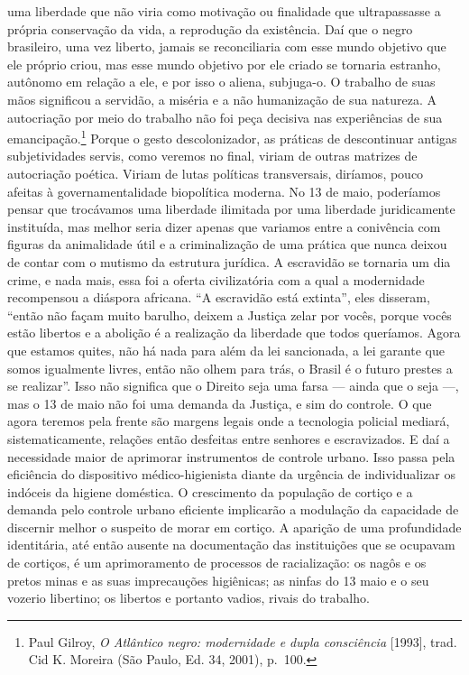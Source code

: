 uma liberdade que não viria como motivação ou finalidade que
ultrapassasse a própria conservação da vida, a reprodução da existência.
Daí que o negro brasileiro, uma vez liberto, jamais se reconciliaria com
esse mundo objetivo que ele próprio criou, mas esse mundo objetivo por
ele criado se tornaria estranho, autônomo em relação a ele, e por isso o
aliena, subjuga-o. O trabalho de suas mãos significou a servidão, a
miséria e a não humanização de sua natureza. A autocriação por meio do
trabalho não foi peça decisiva nas experiências de sua
emancipação.\footnote{Paul Gilroy, \textit{O Atlântico negro: modernidade
  e dupla consciência} {[}1993{]}, trad. Cid K. Moreira (São Paulo, Ed.
  34, 2001), p.~100.} Porque o gesto descolonizador, as práticas de
descontinuar antigas subjetividades servis, como veremos no final,
viriam de outras matrizes de autocriação poética. Viriam de lutas
políticas transversais, diríamos, pouco afeitas à governamentalidade
biopolítica moderna. No 13 de maio, poderíamos pensar que trocávamos uma
liberdade ilimitada por uma liberdade juridicamente instituída, mas
melhor seria dizer apenas que variamos entre a conivência com figuras da
animalidade útil e a criminalização de uma prática que nunca deixou de
contar com o mutismo da estrutura jurídica. A escravidão se tornaria um
dia crime, e nada mais, essa foi a oferta civilizatória com a qual a
modernidade recompensou a diáspora africana. ``A escravidão está
extinta'', eles disseram, ``então não façam muito barulho, deixem a
Justiça zelar por vocês, porque vocês estão libertos e a abolição é a
realização da liberdade que todos queríamos. Agora que estamos quites,
não há nada para além da lei sancionada, a lei garante que somos
igualmente livres, então não olhem para trás, o Brasil é o futuro
prestes a se realizar''. Isso não significa que o Direito seja uma farsa
--- ainda que o seja ---, mas o 13 de maio não foi uma demanda da Justiça,
e sim do controle. O que agora teremos pela frente são margens legais
onde a tecnologia policial mediará, sistematicamente, relações então
desfeitas entre senhores e escravizados. E daí a necessidade maior de
aprimorar instrumentos de controle urbano. Isso passa pela eficiência do
dispositivo médico-higienista diante da urgência de individualizar os
indóceis da higiene doméstica. O crescimento da população de cortiço e a
demanda pelo controle urbano eficiente implicarão a modulação da
capacidade de discernir melhor o suspeito de morar em cortiço. A
aparição de uma profundidade identitária, até então ausente na
documentação das instituições que se ocupavam de cortiços, é um
aprimoramento de processos de racialização: os nagôs e os pretos minas e
as suas imprecauções higiênicas; as ninfas do 13 maio e o seu vozerio
libertino; os libertos e portanto vadios, rivais do trabalho.

